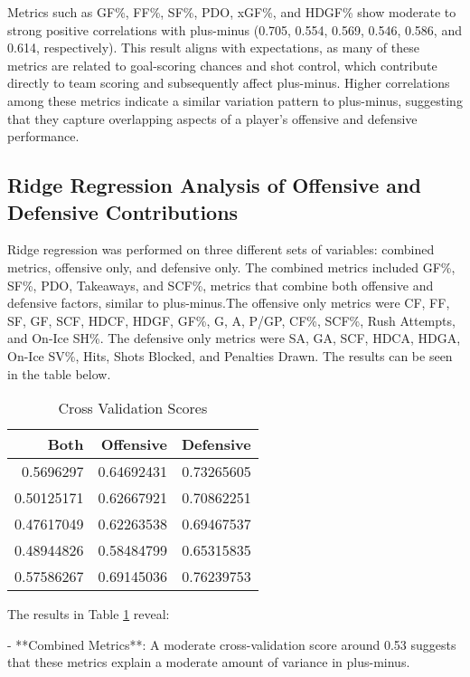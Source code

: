 \documentclass[12pt]{article}
\begin{document}
Metrics such as GF\%, FF\%, SF\%, PDO, xGF\%, and HDGF\% show moderate to strong positive correlations with plus-minus (0.705, 0.554, 
0.569, 0.546, 0.586, and 0.614, respectively). This result aligns with expectations, as many of these metrics are related to goal-scoring 
chances and shot control, which contribute directly to team scoring and subsequently affect plus-minus. Higher correlations among these 
metrics indicate a similar variation pattern to plus-minus, suggesting that they capture overlapping aspects of a player's offensive and 
defensive performance.

\subsection{Ridge Regression Analysis of Offensive and Defensive Contributions}

Ridge regression was performed on three different sets of variables: combined metrics, offensive only, and defensive only. The combined 
metrics included GF\%, SF\%, PDO, Takeaways, and SCF\%, metrics that combine both offensive and defensive factors, similar to 
plus-minus.The offensive only metrics were CF, FF, SF, GF, SCF, HDCF, HDGF, GF\%, G, A, P/GP, CF\%, SCF\%, Rush Attempts, and On-Ice SH\%. 
The defensive only metrics were SA, GA, SCF, HDCA, HDGA, On-Ice SV\%, Hits, Shots Blocked, and Penalties Drawn. The results can be seen in the table below.

\begin{table}[tbp]
  \caption{Cross Validation Scores}
  \label{tab:rv2}
\centering
\begin{tabular}{rrr}
  \toprule
Both & Offensive & Defensive \\ 
  \midrule
  0.5696297 & 0.64692431 & 0.73265605 \\ 
  0.50125171 & 0.62667921 & 0.70862251 \\ 
  0.47617049 & 0.62263538 & 0.69467537 \\ 
  0.48944826 & 0.58484799 & 0.65315835 \\ 
  0.57586267 & 0.69145036 & 0.76239753 \\ 
  \bottomrule
\end{tabular}
\end{table}

The results in Table \ref{tab:rv2} reveal:

- **Combined Metrics**: A moderate cross-validation score around 0.53 suggests that these metrics explain a moderate amount of variance 
in plus-minus.
\end{document}
